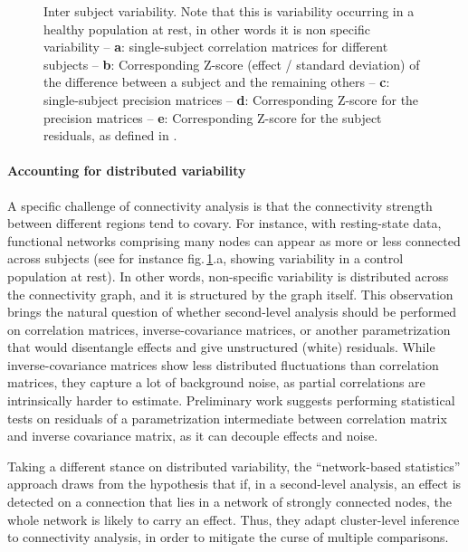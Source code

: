 \documentclass[5p]{elsarticle}
\begin{document}
\begin{figure}
\caption{Inter subject variability. Note that this is variability
occurring in a healthy population at rest, in other words it is non specific
variability -- \textbf{a}: single-subject
correlation matrices for different subjects -- \textbf{b}:
Corresponding Z-score (effect / standard deviation) of the difference
between a subject and the remaining others -- \textbf{c}:
single-subject precision matrices -- \textbf{d}: Corresponding Z-score
for the precision matrices -- \textbf{e}:
Corresponding Z-score for the subject residuals, as defined in 
\cite{varoquaux2010b}.
\label{fig:inter_subject}}
\end{figure}

\paragraph{Accounting for distributed variability}
%
A specific challenge of connectivity analysis is that the connectivity
strength between different regions tend to covary. For instance, with
resting-state data, functional networks comprising many nodes can appear
as more or less connected across subjects (see for instance
fig.\,\ref{fig:inter_subject}.a, showing variability in a control
population at rest). In other words, non-specific variability is
distributed across the connectivity graph, and it is structured by the
graph itself. This observation brings the natural question of whether
second-level analysis should be performed on correlation matrices,
inverse-covariance matrices, or another parametrization that would
disentangle effects and give unstructured (white) residuals. While
inverse-covariance matrices show less distributed fluctuations than
correlation matrices, they capture a lot of background noise, as partial
correlations are intrinsically harder to estimate. Preliminary work
\cite{varoquaux2010b} suggests performing statistical tests on residuals of
a parametrization intermediate between correlation matrix and inverse
covariance matrix, as it can decouple effects and noise.

Taking a different stance on distributed variability, the ``network-based
statistics'' approach \cite{zalesky2010} draws from the hypothesis that
if, in a second-level analysis, an effect is detected on a connection
that lies in a network of strongly connected nodes, the whole network is
likely to carry an effect. Thus, they adapt cluster-level inference to
connectivity analysis, in order to mitigate the curse of multiple
comparisons.
\end{document}

